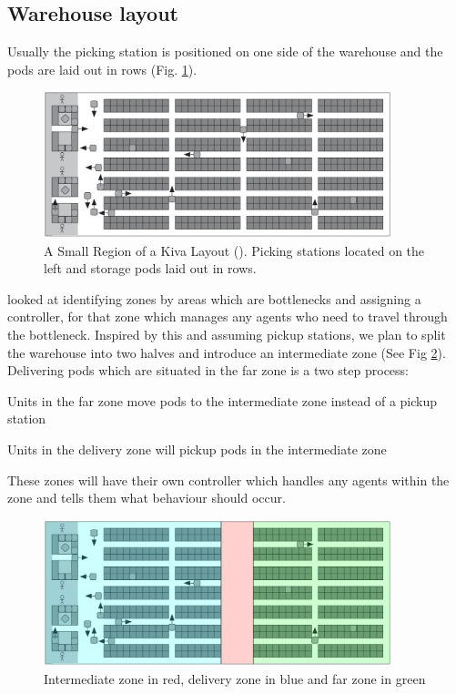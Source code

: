 \documentclass[a4paper,11pt]{article}
\begin{document}
\subsection{Warehouse layout}
Usually the picking station is positioned on one side of the warehouse and the pods are laid out in rows (Fig. \ref{kivalayout1}).

\begin{figure}[h]
	\centering
	\includegraphics[width=0.9\textwidth]{graphics/kivasystemlayout}
	\caption{A Small Region of a Kiva Layout (\cite{wurman2008coordinating}). Picking stations located on the left and storage pods laid out in rows.}
	\label{kivalayout1}
\end{figure}

\cite{wilt2014spatially} looked at identifying zones by areas which are bottlenecks and assigning a controller, for that zone which manages any agents who need to travel through the bottleneck. Inspired by this and assuming pickup stations, we plan to split the warehouse into two halves and introduce an intermediate zone (See Fig \ref{kivalayout2}). Delivering pods which are situated in the far zone is a two step process:
\begin{compactenum}
	\item Units in the far zone move pods to the intermediate zone instead of a pickup station
	\item Units in the delivery zone will pickup pods in the intermediate zone
\end{compactenum}
\noindent These zones will have their own controller which handles any agents within the zone and tells them what behaviour should occur.

\begin{figure}[h]
	\centering
	\includegraphics[width=0.9\textwidth]{graphics/kivasystemlayout_adjusted}
	\caption{Intermediate zone in red, delivery zone in blue and far zone in green}
	\label{kivalayout2}
\end{figure}
\end{document}
